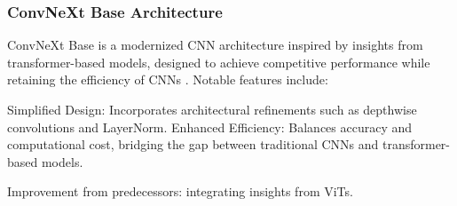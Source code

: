 



\subsubsection{ConvNeXt Base Architecture}
ConvNeXt Base is a modernized CNN architecture inspired by insights from transformer-based models, designed to achieve competitive performance while retaining the efficiency of CNNs \cite{todi2023convnext}. Notable features include:

Simplified Design: Incorporates architectural refinements such as depthwise convolutions and LayerNorm.
Enhanced Efficiency: Balances accuracy and computational cost, bridging the gap between traditional CNNs and transformer-based models. 

Improvement from predecessors: integrating insights from ViTs.

